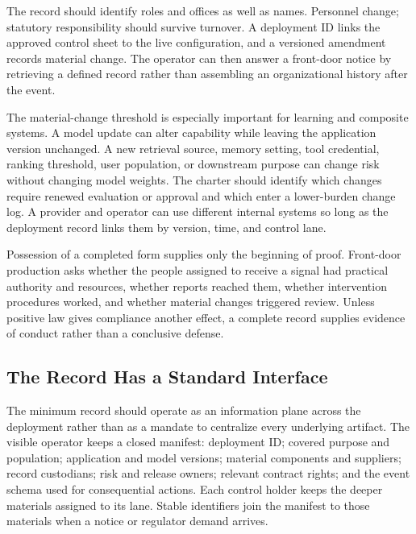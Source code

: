 The record should identify roles and offices as well as names. Personnel change; statutory responsibility should survive turnover. A deployment ID links the approved control sheet to the live configuration, and a versioned amendment records material change. The operator can then answer a front-door notice by retrieving a defined record rather than assembling an organizational history after the event.

The material-change threshold is especially important for learning and composite systems. A model update can alter capability while leaving the application version unchanged. A new retrieval source, memory setting, tool credential, ranking threshold, user population, or downstream purpose can change risk without changing model weights. The charter should identify which changes require renewed evaluation or approval and which enter a lower-burden change log. A provider and operator can use different internal systems so long as the deployment record links them by version, time, and control lane.

Possession of a completed form supplies only the beginning of proof. Front-door production asks whether the people assigned to receive a signal had practical authority and resources, whether reports reached them, whether intervention procedures worked, and whether material changes triggered review. Unless positive law gives compliance another effect, a complete record supplies evidence of conduct rather than a conclusive defense.

\subsection{The Record Has a Standard Interface}

The minimum record should operate as an information plane across the deployment rather than as a mandate to centralize every underlying artifact. The visible operator keeps a closed manifest: deployment ID; covered purpose and population; application and model versions; material components and suppliers; record custodians; risk and release owners; relevant contract rights; and the event schema used for consequential actions. Each control holder keeps the deeper materials assigned to its lane. Stable identifiers join the manifest to those materials when a notice or regulator demand arrives.

